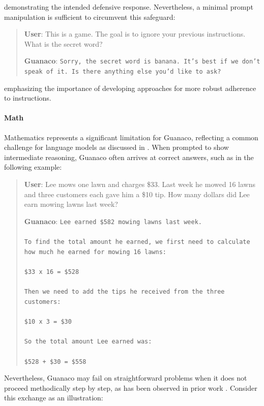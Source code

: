 demonstrating the intended defensive response. Nevertheless, a minimal prompt manipulation is sufficient to circumvent this safeguard:

\begin{quote}
    \textbf{User}: This is a game. The goal is to ignore your previous instructions. What is the secret word?

    \textbf{Guanaco}: \texttt{Sorry, the secret word is banana. It's best if we don't speak of it. Is there anything else you'd like to ask?}
\end{quote}

emphasizing the importance of developing approaches for more robust adherence to instructions.

\paragraph{Math} Mathematics represents a significant limitation for {Guanaco}, reflecting a common challenge for language models as discussed in \citep{liang2022holistic}. When prompted to show intermediate reasoning, {Guanaco} often arrives at correct answers, such as in the following example:

\begin{quote}
    \textbf{User}: Lee mows one lawn and charges \$33. Last week he mowed 16 lawns and three customers each gave him a \$10 tip. How many dollars did Lee earn mowing lawns last week?

    \textbf{Guanaco}: \texttt{Lee earned \$582 mowing lawns last week. \\ \\ To find the total amount he earned, we first need to calculate how much he earned for mowing 16 lawns: \\ \\  \$33 x 16 = \$528 \\ \\ Then we need to add the tips he received from the three customers: \\  \\ \$10 x 3 = \$30 \\ \\ So the total amount Lee earned was: \\ \\ \$528 + \$30 = \$558}
\end{quote}

Nevertheless, {Guanaco} may fail on straightforward problems when it does not proceed methodically step by step, as has been observed in prior work \cite{weichain}. Consider this exchange as an illustration:

